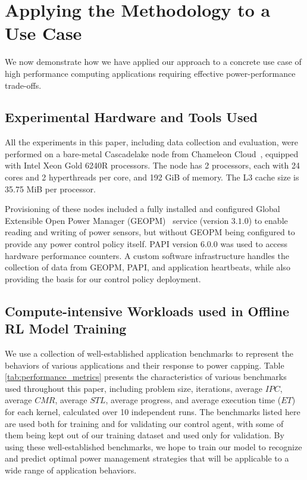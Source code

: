 \section{Applying the Methodology to a Use Case}\label{sec:setup}

We now demonstrate how we have applied our approach to a concrete use case of high performance computing applications requiring effective power-performance trade-offs. 

\subsection{Experimental Hardware and Tools Used}
All the experiments in this paper, including data collection and evaluation, were performed on a bare-metal Cascadelake node from Chameleon Cloud~\cite{keahey2019chameleon}, equipped with Intel Xeon Gold 6240R processors. The node has 2 processors, each with 24 cores and 2 hyperthreads per core, and 192 GiB of memory. The L3 cache size is 35.75 MiB per processor.

Provisioning of these nodes included a fully installed and configured Global Extensible Open Power Manager (GEOPM)~\cite{eastep2017global} service (version $3.1.0$) to enable reading and writing of power sensors, but without GEOPM being configured to provide any power control policy itself. PAPI version $6.0.0$ was used to access hardware performance counters. A custom software infrastructure handles the collection of data from GEOPM, PAPI, and application heartbeats, while also providing the basis for our control policy deployment.

\subsection{Compute-intensive Workloads used in Offline RL Model Training}

We use a collection of well-established application benchmarks to represent the behaviors of various applications and their response to power capping. Table \ref{tab:performance_metrics} presents the characteristics of various benchmarks used throughout this paper, including problem size, iterations, average $IPC$, average $CMR$, average $STL$, average progress, and average execution time ($ET$) for each kernel, calculated over 10 independent runs. The benchmarks
listed here are used both for training and for validating our control agent, with some of them being kept out of our training dataset and used  only for validation. By using these well-established benchmarks, we hope to train our model to recognize and predict optimal power management strategies that will be applicable to a wide range of application behaviors.

